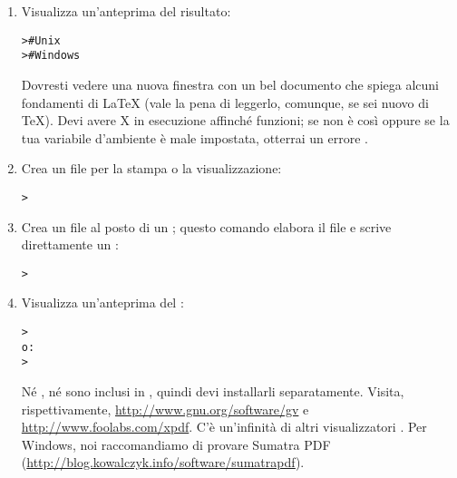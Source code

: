 \documentclass{article}
\begin{document}
\begin{enumerate}
\item Visualizza un'anteprima del risultato:
\begin{alltt}
>     # Unix
>   # Windows
\end{alltt}
Dovresti vedere una nuova finestra con un bel documento che spiega alcuni
fondamenti di \LaTeX{} (vale la pena di leggerlo, comunque, se sei nuovo
di \TeX). Devi avere X in esecuzione affinché  funzioni; se
non è così oppure se la tua variabile d'ambiente  è
male impostata, otterrai un errore .

\item Crea un file \PS{} per la stampa o la visualizzazione:
\begin{alltt}
> 
\end{alltt}

\item Crea un file  al posto di un \dvi{}; questo comando
elabora il file  e scrive direttamente un :
\begin{alltt}
> 
\end{alltt}

\item Visualizza un'anteprima del :
\begin{alltt}
> 
\textrm{o:}
%\textrm{or:}
> 
\end{alltt}
Né , né  sono inclusi in \TL{}, quindi devi
installarli separatamente. Visita, rispettivamente,
\url{http://www.gnu.org/software/gv} e \url{http://www.foolabs.com/xpdf}.
C'è un'infinità di altri visualizzatori . Per Windows, noi
raccomandiamo di provare Sumatra PDF
(\url{http://blog.kowalczyk.info/software/sumatrapdf}).


\end{enumerate}
\end{document}
